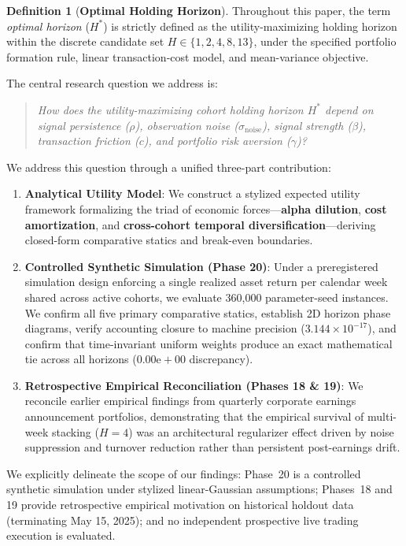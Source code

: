 \documentclass[11pt,a4paper]{article}
\theoremstyle{definition}
\newtheorem{definition}{Definition}
\begin{document}
\begin{definition}[\textbf{Optimal Holding Horizon}]
Throughout this paper, the term \emph{optimal horizon} ($H^*$) is strictly defined as the utility-maximizing holding horizon within the discrete candidate set $H \in \{1, 2, 4, 8, 13\}$, under the specified portfolio formation rule, linear transaction-cost model, and mean-variance objective.
\end{definition}

The central research question we address is:
\begin{quote}
\itshape
How does the utility-maximizing cohort holding horizon $H^*$ depend on signal persistence ($\rho$), observation noise ($\sigma_{\mathrm{noise}}$), signal strength ($\beta$), transaction friction ($c$), and portfolio risk aversion ($\gamma$)?
\end{quote}

We address this question through a unified three-part contribution:
\begin{enumerate}
    \item \textbf{Analytical Utility Model}: We construct a stylized expected utility framework formalizing the triad of economic forces---\textbf{alpha dilution}, \textbf{cost amortization}, and \textbf{cross-cohort temporal diversification}---deriving closed-form comparative statics and break-even boundaries.
    \item \textbf{Controlled Synthetic Simulation (Phase 20)}: Under a preregistered simulation design enforcing a single realized asset return per calendar week shared across active cohorts, we evaluate 360,000 parameter-seed instances. We confirm all five primary comparative statics, establish 2D horizon phase diagrams, verify accounting closure to machine precision ($3.144 \times 10^{-17}$), and confirm that time-invariant uniform weights produce an exact mathematical tie across all horizons ($0.00\text{e}+00$ discrepancy).
    \item \textbf{Retrospective Empirical Reconciliation (Phases 18 \& 19)}: We reconcile earlier empirical findings from quarterly corporate earnings announcement portfolios, demonstrating that the empirical survival of multi-week stacking ($H=4$) was an architectural regularizer effect driven by noise suppression and turnover reduction rather than persistent post-earnings drift.
\end{enumerate}

We explicitly delineate the scope of our findings: Phase~20 is a controlled synthetic simulation under stylized linear-Gaussian assumptions; Phases~18 and 19 provide retrospective empirical motivation on historical holdout data (terminating May 15, 2025); and no independent prospective live trading execution is evaluated.
\end{document}
